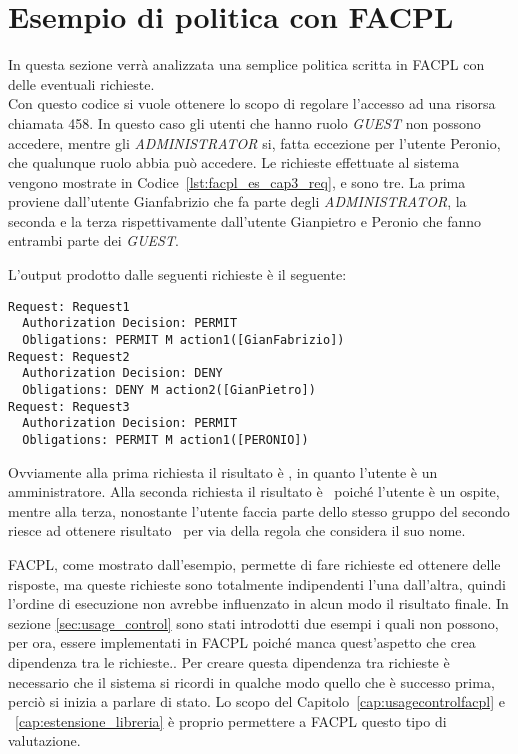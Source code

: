\section{Esempio di politica con FACPL} %
\label{sec:esempio_di_politica_con_facpl}
In questa sezione verrà analizzata una semplice politica scritta in FACPL con delle eventuali richieste.\\
 
Con questo codice si vuole ottenere lo scopo di regolare l'accesso ad una risorsa chiamata 458. In questo caso gli utenti che hanno ruolo \textit{GUEST} non possono accedere, mentre gli \textit{ADMINISTRATOR} si, fatta eccezione per l'utente Peronio, che qualunque ruolo abbia può accedere.
Le richieste effettuate al sistema vengono mostrate in Codice~\ref{lst:facpl_es_cap3_req}, e sono tre. La prima proviene dall'utente Gianfabrizio che fa parte degli \textit{ADMINISTRATOR}, la seconda e la terza rispettivamente dall'utente Gianpietro e Peronio che fanno entrambi parte dei \textit{GUEST}. 
 
L'output prodotto dalle seguenti richieste è il seguente:
\begin{verbatim}
Request: Request1
  Authorization Decision: PERMIT 
  Obligations: PERMIT M action1([GianFabrizio])
Request: Request2
  Authorization Decision: DENY 
  Obligations: DENY M action2([GianPietro])
Request: Request3
  Authorization Decision: PERMIT 
  Obligations: PERMIT M action1([PERONIO])
\end{verbatim}
Ovviamente alla prima richiesta il risultato è \permit, in quanto l'utente è un amministratore. Alla seconda richiesta il risultato è \deny \ poiché l'utente è un ospite, mentre alla terza, nonostante l'utente faccia parte dello stesso gruppo del secondo riesce ad ottenere risultato \permit \ per via della regola che considera il suo nome.\\ \par
FACPL, come mostrato dall'esempio, permette di fare richieste ed ottenere delle risposte, ma queste richieste sono totalmente indipendenti l'una dall'altra, quindi l'ordine di esecuzione non avrebbe influenzato in alcun modo il risultato finale.
In sezione \ref{sec:usage_control} sono stati introdotti due esempi i quali non possono, per ora, essere implementati in FACPL poiché manca quest'aspetto che crea dipendenza tra le richieste..
Per creare questa dipendenza tra richieste è necessario che il sistema si ricordi in qualche modo quello che è successo prima, perciò si inizia a parlare di stato. Lo scopo del Capitolo~\ref{cap:usagecontrolfacpl} e ~\ref{cap:estensione_libreria} è proprio permettere a FACPL questo tipo di valutazione.

